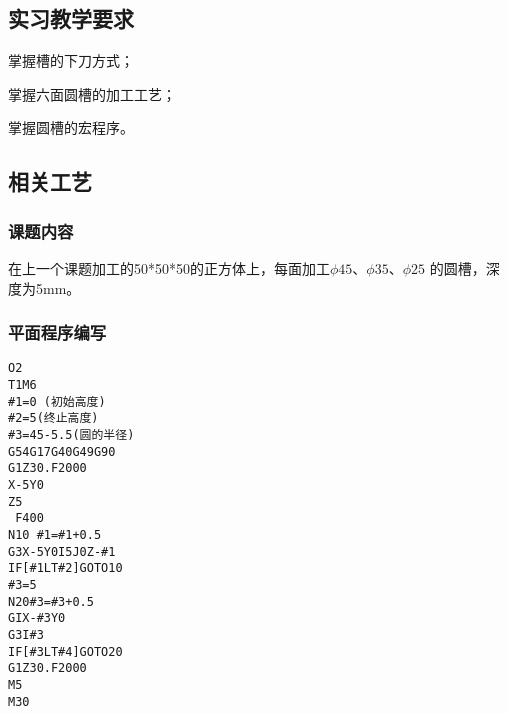 \jxhj{%
	}

\makeshouye %

\subsection{实习教学要求}
\begin{compactenum}[\hspace{2em}1、]
		\item 掌握槽的下刀方式；
	\item 掌握六面圆槽的加工工艺；
	\item  掌握圆槽的宏程序。
\end{compactenum}

\subsection{相关工艺}
\subsubsection{课题内容}
在上一个课题加工的50*50*50的正方体上，每面加工$\phi  45$、$\phi  
35$、$\phi  25$ 的圆槽，深度为5mm。

\subsubsection{平面程序编写}

\begin{lstlisting}
O2
T1M6
#1=0 (初始高度)
#2=5(终止高度)
#3=45-5.5(圆的半径)
G54G17G40G49G90
G1Z30.F2000
X-5Y0
Z5
 F400
N10 #1=#1+0.5
G3X-5Y0I5J0Z-#1
IF[#1LT#2]GOTO10
#3=5
N20#3=#3+0.5
GIX-#3Y0
G3I#3
IF[#3LT#4]GOTO20
G1Z30.F2000
M5
M30
\end{lstlisting}



